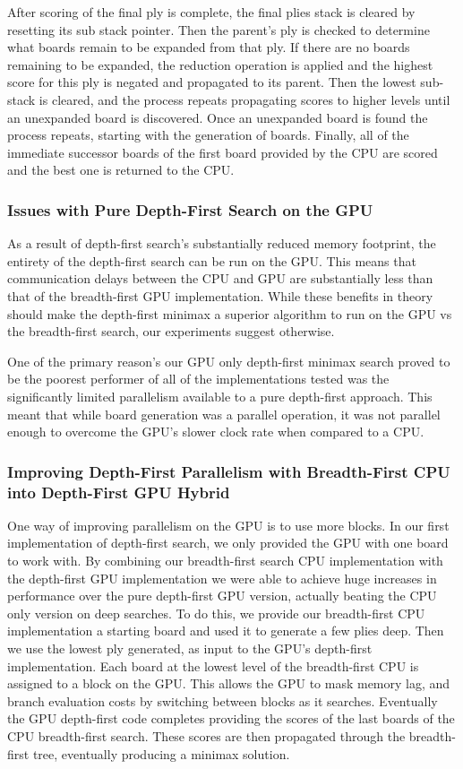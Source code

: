 \documentclass[11pt]{article}
\begin{document}
After scoring of the final ply is complete, the final plies stack is cleared by
resetting its sub stack pointer. Then the parent's ply is checked to determine
what boards remain to be expanded from that ply. If there are no boards
remaining to be expanded, the reduction operation is applied and the highest
score for this ply is negated and propagated to its parent. Then the lowest
sub-stack is cleared, and the process repeats propagating scores to higher
levels until an unexpanded board is discovered. Once an unexpanded board is found
the process repeats, starting with the generation of boards.  Finally, all of
the immediate successor boards of the first board provided by the CPU are scored
and the best one is returned to the CPU.

\subsubsection{Issues with Pure Depth-First Search on the GPU}
\label{sec:GPUDFSissues}

As a result of depth-first search's substantially reduced memory footprint, the entirety of the
depth-first search can be run on the GPU. This means that communication delays
between the CPU and GPU are substantially less than that of the breadth-first
GPU implementation. While these benefits in theory should make the depth-first
minimax a superior algorithm to run on the GPU vs the breadth-first search, our
experiments suggest otherwise.

One of the primary reason's our GPU only depth-first minimax search proved to be
the poorest performer of all of the implementations tested was the significantly
limited parallelism available to a pure depth-first approach. This meant that
while board generation was a parallel operation, it was not parallel enough to overcome
the GPU's slower clock rate when compared to a CPU.

\subsubsection{Improving Depth-First Parallelism with Breadth-First CPU into Depth-First GPU Hybrid}
\label{sec:GPUDFSimproved}

One way of improving parallelism on the GPU is to use more blocks. In our first implementation of
depth-first search, we only provided the GPU with one board to work with. By combining our breadth-first
search CPU implementation with the depth-first GPU implementation we were able to achieve huge increases
in performance over the pure depth-first GPU version, actually beating the CPU only version on deep searches.
To do this, we provide our breadth-first CPU implementation a starting board and used it to generate a few
plies deep. Then we use the lowest ply generated, as input to the GPU's depth-first implementation. 
Each board at the lowest level of the breadth-first CPU is assigned
to a block on the GPU. This allows the GPU to mask memory lag, and branch evaluation costs by switching between
blocks as it searches. Eventually the GPU depth-first code completes providing the scores of the last boards of the
CPU breadth-first search. These scores are then propagated through the breadth-first tree, eventually producing a
minimax solution.
\end{document}
